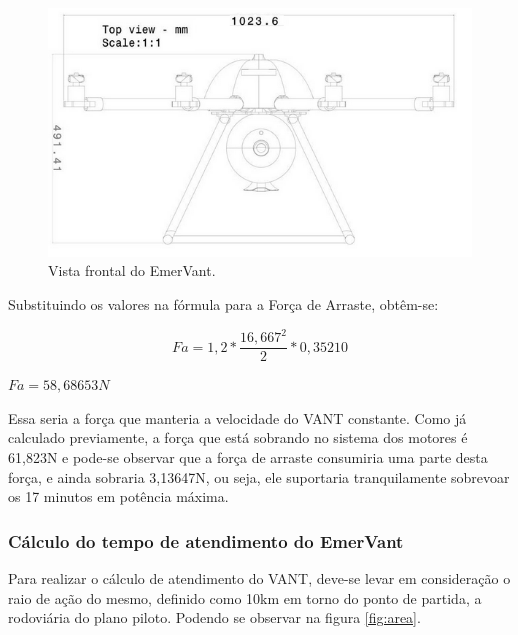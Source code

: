 \begin{figure}[H]
    \centering
	\includegraphics[keepaspectratio=true,scale=0.6]{figuras/vista_frontal.png}
    \caption{Vista frontal do EmerVant.}
    \label{fig:vista_frontal}
\end{figure}

Substituindo os valores na fórmula para a Força de Arraste, obtêm-se:

\begin{equation}
 Fa = 1,2 * \frac{16,667 ^ 2}{2} * 0,35210
\end{equation}

\begin{center}
 $Fa = 58,68653 N$
\end{center}

Essa seria a força que manteria a velocidade do VANT constante. 
Como já calculado previamente, a força que está sobrando no sistema dos motores é
61,823N e pode-se observar que a força de arraste consumiria uma parte desta força, 
e ainda sobraria 3,13647N, ou seja, ele suportaria tranquilamente sobrevoar os 
17 minutos em potência máxima. 

\subsubsection{Cálculo do tempo de atendimento do EmerVant}

Para realizar o cálculo de atendimento do VANT, deve-se levar em consideração o raio de ação do mesmo, definido como 10km em torno do ponto de partida, a rodoviária do plano piloto. Podendo se observar na figura \ref{fig:area}.

